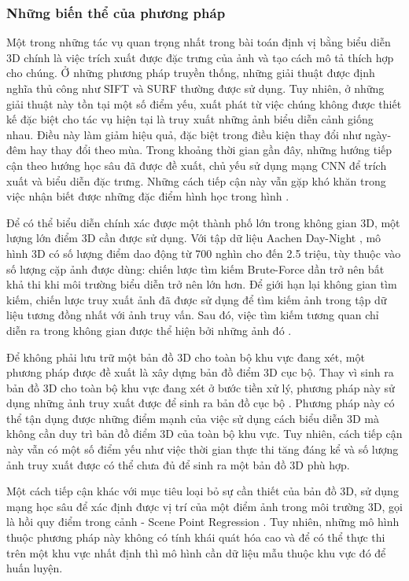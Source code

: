 \subsubsection*{Những biến thể của phương pháp}

Một trong những tác vụ quan trọng nhất trong bài toán định vị bằng biểu diễn 3D chính là việc trích xuất được đặc trưng của ảnh và tạo cách mô tả thích hợp cho chúng. Ở những phương pháp truyền thống, những giải thuật được định nghĩa thủ công như SIFT \cite{lowe2004distinctive} và SURF \cite{bay2006surf} thường được sử dụng. Tuy nhiên, ở những giải thuật này tồn tại một số điểm yếu, xuất phát từ việc chúng không được thiết kế đặc biệt cho tác vụ hiện tại là truy xuất những ảnh biểu diễn cảnh giống nhau. Điều này làm giảm hiệu quả, đặc biệt trong điều kiện thay đổi như ngày-đêm hay thay đổi theo mùa. Trong khoảng thời gian gần đây, những hướng tiếp cận theo hướng học sâu đã được đề xuất, chủ yếu sử dụng mạng CNN để trích xuất và biểu diễn đặc trưng. Những cách tiếp cận này vẫn gặp khó khăn trong việc nhận biết được những đặc điểm hình học trong hình \cite{zhou2020learn}.

Để có thể biểu diễn chính xác được một thành phố lớn trong không gian 3D, một lượng lớn điểm 3D cần được sử dụng. Với tập dữ liệu Aachen Day-Night \cite{sattler2018benchmarking}, mô hình 3D có số lượng điểm dao động từ 700 nghìn cho đến 2.5 triệu, tùy thuộc vào số lượng cặp ảnh được dùng: chiến lược tìm kiếm Brute-Force dần trở nên bất khả thi khi môi trường biểu diễn trở nên lớn hơn. Để giới hạn lại không gian tìm kiếm, chiến lược truy xuất ảnh đã được sử dụng để tìm kiếm ảnh trong tập dữ liệu tương đồng nhất với ảnh truy vấn. Sau đó, việc tìm kiếm tương quan chỉ diễn ra trong không gian được thể hiện bởi những ảnh đó \cite{sarlin2019coarse}.

Để không phải lưu trữ một bản đồ 3D cho toàn bộ khu vực đang xét, một phương pháp được đề xuất là xây dựng bản đồ điểm 3D cục bộ. Thay vì sinh ra bản đồ 3D cho toàn bộ khu vực đang xét ở bước tiền xử lý, phương pháp này sử dụng những ảnh truy xuất được để sinh ra bản đồ cục bộ \cite{sattler2017large}. Phương pháp này có thể tận dụng được những điểm mạnh của việc sử dụng cách biểu diễn 3D mà không cần duy trì bản đồ điểm 3D của toàn bộ khu vực. Tuy nhiên, cách tiếp cận này vẫn có một số điểm yếu như việc thời gian thực thi tăng đáng kể và số lượng ảnh truy xuất được có thể chưa đủ để sinh ra một bản đồ 3D phù hợp.

Một cách tiếp cận khác với mục tiêu loại bỏ sự cần thiết của bản đồ 3D, sử dụng mạng học sâu để xác định được vị trí của một điểm ảnh trong môi trường 3D, gọi là hồi quy điểm trong cảnh - Scene Point Regression \cite{brachmann2021visual}. Tuy nhiên, những mô hình thuộc phương pháp này không có tính khái quát hóa cao và để có thể thực thi trên một khu vực nhất định thì mô hình cần dữ liệu mẫu thuộc khu vực đó để huấn luyện.
